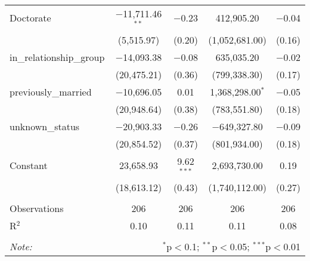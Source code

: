 \begin{table}[!htbp]
\begin{tabular}{@{\extracolsep{1pt}}lcccc}
  Doctorate & $-$11,711.46$^{**}$ & $-$0.23 & 412,905.20 & $-$0.04 \\ 
  & (5,515.97) & (0.20) & (1,052,681.00) & (0.16) \\ 
  in\_relationship\_group & $-$14,093.38 & $-$0.08 & 635,035.20 & $-$0.02 \\ 
  & (20,475.21) & (0.36) & (799,338.30) & (0.17) \\ 
  previously\_married & $-$10,696.05 & 0.01 & 1,368,298.00$^{*}$ & $-$0.05 \\ 
  & (20,948.64) & (0.38) & (783,551.80) & (0.18) \\ 
  unknown\_status & $-$20,903.33 & $-$0.26 & $-$649,327.80 & $-$0.09 \\ 
  & (20,854.52) & (0.37) & (801,934.00) & (0.18) \\ 
  Constant & 23,658.93 & 9.62$^{***}$ & 2,693,730.00 & 0.19 \\ 
  & (18,613.12) & (0.43) & (1,740,112.00) & (0.27) \\ 
 \hline \\[-1.8ex] 
Observations & 206 & 206 & 206 & 206 \\ 
R$^{2}$ & 0.10 & 0.11 & 0.11 & 0.08 \\ 
\hline 
\hline \\[-1.8ex] 
\textit{Note:}  & \multicolumn{4}{r}{$^{*}$p$<$0.1; $^{**}$p$<$0.05; $^{***}$p$<$0.01} \\ 
\end{tabular} 
\end{table} 
